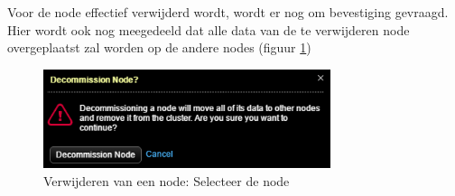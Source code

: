 Voor de node effectief verwijderd wordt, wordt er nog om bevestiging gevraagd.
Hier wordt ook nog meegedeeld dat alle data van de te verwijderen node overgeplaatst zal worden op de andere nodes (figuur \ref{fig:cas_rem_3})

\begin{figure}[H]
	\centering
	\includegraphics[width=0.75\textwidth]{img/4_installatie_cassandra/5_Remove_Node_3}
	\caption{Verwijderen van een node: Selecteer de node}
	\label{fig:cas_rem_3}
\end{figure}